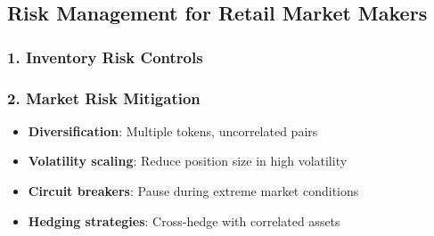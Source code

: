 \hypertarget{risk-management-for-retail-market-makers}{%
\subsection{Risk Management for Retail Market
Makers}\label{risk-management-for-retail-market-makers}}

\hypertarget{inventory-risk-controls}{%
\subsubsection{\texorpdfstring{1. \textbf{Inventory Risk
Controls}}{1. Inventory Risk Controls}}\label{inventory-risk-controls}}

\begin{Shaded}
\begin{Highlighting}[]
\OperatorTok{=}\OperatorTok{*}   
\OperatorTok{=}   
\OperatorTok{=}   
    
     \OperatorTok{\textgreater{}}
    
    \OperatorTok{\textgreater{}}
\end{Highlighting}
\end{Shaded}

\hypertarget{market-risk-mitigation}{%
\subsubsection{\texorpdfstring{2. \textbf{Market Risk
Mitigation}}{2. Market Risk Mitigation}}\label{market-risk-mitigation}}

\begin{itemize}
\tightlist
\item
  \textbf{Diversification}: Multiple tokens, uncorrelated pairs
\item
  \textbf{Volatility scaling}: Reduce position size in high volatility
\item
  \textbf{Circuit breakers}: Pause during extreme market conditions
\item
  \textbf{Hedging strategies}: Cross-hedge with correlated assets
\end{itemize}

